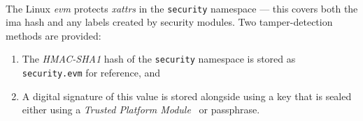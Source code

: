 \paragraph{} The Linux \textit{\acrfull{evm}} protects \textit{xattrs} in the \texttt{security} namespace --- this covers both the \acrshort{ima} hash and any labels created by security modules. Two tamper-detection methods are provided:

\begin{enumerate}
    \item The \textit{HMAC-SHA1} hash of the \texttt{security} namespace is stored as \texttt{security.evm} for reference, and
    \item A digital signature of this value is stored alongside using a key that is sealed either using a \textit{Trusted Platform Module}~\cite{tpm} or passphrase.
\end{enumerate}
